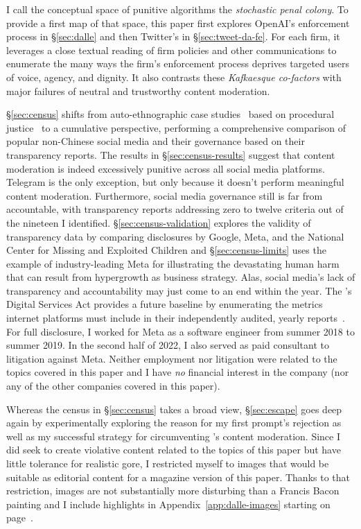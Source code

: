 I call the conceptual space of punitive algorithms the \emph{stochastic penal
colony}. To provide a first map of that space, this paper first explores
OpenAI's enforcement process in \S\ref{sec:dalle} and then Twitter's in
\S\ref{sec:tweet-da-fe}. For each firm, it leverages a close textual reading of
firm policies and other communications to enumerate the many ways the firm's
enforcement process deprives targeted users of voice, agency, and dignity. It
also contrasts these \emph{Kafkaesque co-factors} with major failures of neutral
and trustworthy content moderation.

\S\ref{sec:census} shifts from auto-ethnographic case studies~\cite{Ellis2003}
based on procedural justice~\cite{Tyler2003,Tyler2006,Tyler2007} to a cumulative
perspective, performing a comprehensive comparison of popular non-Chinese social
media and their governance based on their transparency reports. The results in
\S\ref{sec:census-results} suggest that content moderation is indeed excessively
punitive across all social media platforms. Telegram is the only exception, but
only because it doesn't perform meaningful content moderation. Furthermore,
social media governance still is far from accountable, with transparency reports
addressing zero to twelve criteria out of the nineteen I identified.
\S\ref{sec:census-validation} explores the validity of transparency data by
comparing disclosures by Google, Meta, and the National Center for Missing and
Exploited Children and \S\ref{sec:census-limits} uses the example of
industry-leading Meta for illustrating the devastating human harm that can
result from hypergrowth as business strategy. Alas, social media's lack of
transparency and accountability may just come to an end within the year. The
's Digital Services Act provides a future baseline by enumerating the
metrics internet platforms must include in their independently audited, yearly
reports~\cite{EuropeanParliamentAndCouncil2022}. For full disclosure, I worked
for Meta as a software engineer from summer 2018 to summer 2019. In the second
half of 2022, I also served as paid consultant to litigation against Meta.
Neither employment nor litigation were related to the topics covered in this
paper and I have \emph{no} financial interest in the company (nor any of the
other companies covered in this paper).

Whereas the census in \S\ref{sec:census} takes a broad view, \S\ref{sec:escape}
goes deep again by experimentally exploring the reason for my first prompt's
rejection as well as my successful strategy for circumventing \DALLE's content
moderation. Since I did seek to create violative content related to the topics
of this paper but have little tolerance for realistic gore, I restricted myself
to images that would be suitable as editorial content for a magazine version of
this paper. Thanks to that restriction, images are not substantially more
disturbing than a Francis Bacon painting and I include highlights in
Appendix~\ref{app:dalle-images} starting on page~\pageref{app:dalle-images}.

